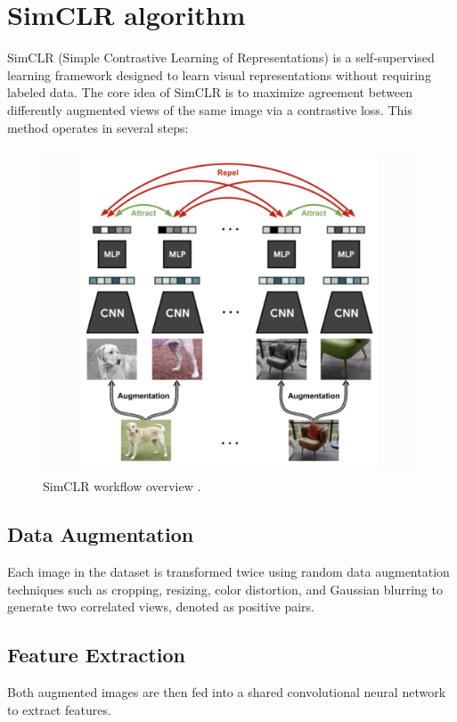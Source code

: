 \section{SimCLR algorithm}
SimCLR (Simple Contrastive Learning of Representations) is a self-supervised learning framework designed to learn visual representations without requiring labeled data. The core idea of SimCLR is to maximize agreement between differently augmented views of the same image via a contrastive loss. This method operates in several steps:

\begin{figure}[hbt]
\centering
\includegraphics[width=\textwidth]{figs/SimCLR.png}
\caption{
SimCLR workflow overview \cite{tsimcne}.
}
\label{fig:secex}
\end{figure}

\subsection{Data Augmentation}
Each image in the dataset is transformed twice using random data augmentation techniques such as cropping, resizing, color distortion, and Gaussian blurring to generate two correlated views, denoted as positive pairs. 

\subsection{Feature Extraction}
Both augmented images are then fed into a shared convolutional neural network to extract features.

